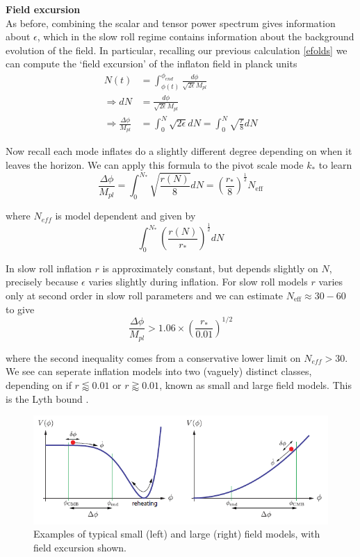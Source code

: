 \documentclass[a4paper,10pt]{article}
\newcommand{\Mp}{M_{pl}}
\newcommand{\half}{\frac{1}{2}}
\begin{document}
\textbf{Field excursion}\\

As before, combining the scalar and tensor power spectrum gives information about $\epsilon$, which in the slow roll regime contains information about the background evolution of the field. In particular, recalling our previous calculation \ref{efolds} we can compute the `field excursion' of the inflaton field in planck units
\begin{equation}\begin{split}
N(t) &=  \int_{\phi(t)}^{\phi_{end}} \frac{d\phi}{\sqrt{2\epsilon}\Mp}\\
\Rightarrow dN&=\frac{d\phi}{\sqrt{2\epsilon}\Mp}\\
\Rightarrow \frac{\Delta \phi}{\Mp} &= \int_0^N \sqrt{2\epsilon} dN = \int_0^N \sqrt{\frac{r}{8}} dN 
\end{split}\end{equation}

Now recall each mode inflates do a slightly different degree depending on when it leaves the horizon. We can apply this formula to the pivot scale mode $k_*$ to learn 
\begin{equation}
\frac{\Delta \phi}{\Mp} =  \int_0^{N_*} \sqrt{\frac{r(N)}{8}} dN  = \left(\frac{r_*}{8}\right)^\half N_{\text{eff}}
\end{equation}

where $N_{eff}$ is model dependent and given by
\begin{equation}
\int_0^{N_*}\left(\frac{r(N)}{r_*}\right)^\half dN
\end{equation}


In slow roll inflation $r$ is approximately constant, but depends slightly on $N$, precisely because $\epsilon$ varies slightly during inflation. For slow roll models $r$ varies only at second order in slow roll parameters and we can estimate  $N_{\text{eff}} \approx 30-60$ to give
\begin{equation}
\frac{\Delta \phi}{\Mp} > 1.06 \times (\frac{r_*}{0.01})^{1/2}
\end{equation}

where the second inequality comes from a conservative lower limit on $N_{eff} > 30$. We see can seperate inflation models into two (vaguely) distinct classes, depending on if $r\lessapprox 0.01$ or $r\gtrapprox 0.01$, known as small and large field models. This is the Lyth bound \cite{Lyth}.\\


\begin{figure}[h]
  \includegraphics[width=0.7\linewidth]{smalllargefield.png}
  \centering
  \caption{Examples of typical small (left) and large (right) field models, with field excursion shown.}
\end{figure}
\end{document}
